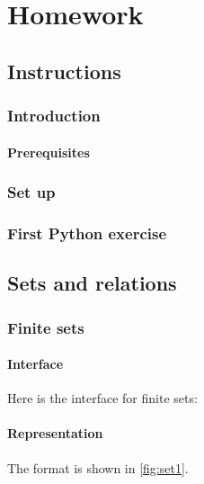 \part{Homework}


\chapter{Instructions}


\section{Introduction}

\subsection{Prerequisites}


\section{Set up}



\section{First Python exercise}



\chapter{Sets and relations}


\section{Finite sets}

\subsection*{Interface}
Here is the interface for finite sets:
%

%

\subsection*{Representation}
The format is shown in \cref{fig:set1}.

